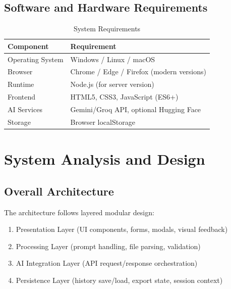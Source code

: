 \documentclass[12pt,a4paper]{report}
\begin{document}
\section{Software and Hardware Requirements}
\begin{table}[H]
\centering
\caption{System Requirements}
\begin{tabular}{|p{1.7in}|p{3.4in}|}
\hline
\textbf{Component} & \textbf{Requirement} \\
\hline
Operating System & Windows / Linux / macOS \\
\hline
Browser & Chrome / Edge / Firefox (modern versions) \\
\hline
Runtime & Node.js (for server version) \\
\hline
Frontend & HTML5, CSS3, JavaScript (ES6+) \\
\hline
AI Services & Gemini/Groq API, optional Hugging Face \\
\hline
Storage & Browser localStorage \\
\hline
\end{tabular}
\end{table}

\chapter{System Analysis and Design}
\section{Overall Architecture}
The architecture follows layered modular design:
\begin{enumerate}
  \item Presentation Layer (UI components, forms, modals, visual feedback)
  \item Processing Layer (prompt handling, file parsing, validation)
  \item AI Integration Layer (API request/response orchestration)
  \item Persistence Layer (history save/load, export state, session context)
\end{enumerate}
\end{document}
